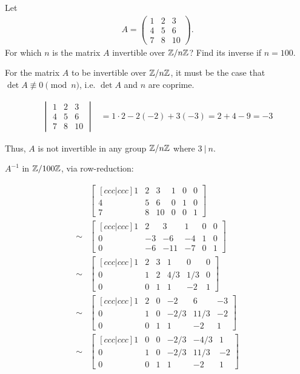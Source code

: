 \begin{problem} 
Let 
\begin{align*}
A=\begin{pmatrix}
1 & 2 & 3 \\
4 & 5 & 6 \\
7 & 8 & 10 
\end{pmatrix}.
\end{align*}
For which $n$ is the matrix $A$ invertible over $\mathbb{Z}/n\mathbb{Z}$?  Find its inverse if $n=100$.
\end{problem}

\begin{Answer}

For the matrix $A$ to be invertible over $\mathbb{Z}/n\mathbb{Z}$, it must be the case that $\det{A}\nequiv 0 \pmod n$,
i.e. $\det{A}$ and $n$ are coprime.

\begin{align*}
\begin{vmatrix}
1 & 2 & 3 \\
4 & 5 & 6 \\
7 & 8 & 10 
\end{vmatrix} &= 1 \cdot 2 - 2(-2) + 3 (-3) = 2 + 4 - 9 = -3
\end{align*}

\noindent
Thus, $A$ is not invertible in any group $\mathbb{Z}/n\mathbb{Z}$ where $3\ |\ n$.

\noindent
$A^{-1}$ in $\mathbb{Z}/100\mathbb{Z}$, via row-reduction:

\begin{align*}
  &\begin{bmatrix}[ccc|ccc]
    1 & 2 & 3 & 1 & 0 & 0\\
    4 & 5 & 6 & 0 & 1 & 0\\
    7 & 8 & 10 & 0 & 0 & 1 
  \end{bmatrix}\\
  \sim &\begin{bmatrix}[ccc|ccc]
    1 & 2 & 3 & 1 & 0 & 0\\
    0 & -3 & -6 & -4 & 1 & 0\\
    0 & -6 & -11 & -7 & 0 & 1 
  \end{bmatrix}\\
  \sim &\begin{bmatrix}[ccc|ccc]
    1 & 2 & 3 & 1 & 0 & 0\\
    0 & 1 & 2 & 4/3 & 1/3 & 0\\
    0 & 0 & 1 & 1 & -2 & 1 
  \end{bmatrix}\\
  \sim &\begin{bmatrix}[ccc|ccc]
    1 & 2 & 0 & -2 & 6 & -3\\
    0 & 1 & 0 & -2/3 & 11/3 & -2\\
    0 & 0 & 1 & 1 & -2 & 1 
  \end{bmatrix}\\
  \sim &\begin{bmatrix}[ccc|ccc]
    1 & 0 & 0 & -2/3 & -4/3 & 1\\
    0 & 1 & 0 & -2/3 & 11/3 & -2\\
    0 & 0 & 1 & 1 & -2 & 1 
  \end{bmatrix}\\
  \end{align*}


\end{Answer}
